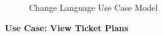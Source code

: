 \documentclass[a4paper,12pt]{report}
\begin{document}
\begin{figure}[!htb]
	\caption{\label{fig:Use Case Model : } Change Language Use Case Model}	
\end{figure} 


\vspace{0.5cm}
\textbf{\large Use Case: View Ticket Plans}
\\
\end{document}
